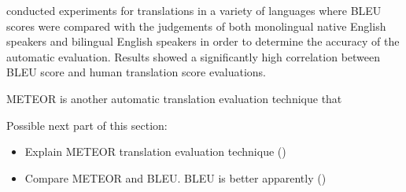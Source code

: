 \cite{papineni_bleu_2001} conducted experiments for translations in a variety of languages where \acrshort{BLEU} scores were compared with the judgements of both monolingual native English speakers and bilingual English speakers in order to determine the accuracy of the automatic evaluation. Results showed a significantly high correlation between \acrshort{BLEU} score and human translation score evaluations.



\acrfull{METEOR} is another automatic translation evaluation technique that  


Possible next part of this section:
\begin{itemize}
    \item Explain METEOR translation evaluation technique (\cite{denkowski_meteor_2014})
    \item Compare METEOR and BLEU. BLEU is better apparently (\cite{laith_comparative_2015})
\end{itemize}














